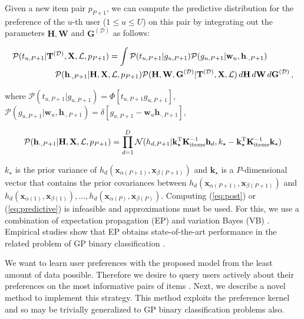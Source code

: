 \vspace{-0.4cm}
\normalsize Given a new item pair $p_{P+1}$, we can compute the predictive distribution for the preference of the $u$-th user ($1 \leq u \leq U$) on this pair by integrating out the parameters $\mathbf{H},\mathbf{W}$ and $\mathbf{G}^{(\mathcal{D})}$ as follows:

\vspace{-0.65cm}
{\small
\begin{align}
\mathcal{P}(t_{u,P+1}|&\mathbf{T}^{(\mathcal{D})},\mathbf{X},\mathcal{L},p_{P+1}) =
\int \mathcal{P}(t_{u,P+1}|g_{u,P+1}) \mathcal{P}(g_{u,P+1}|\mathbf{w}_u,\mathbf{h}_{\cdot,P+1})\notag\\
 & \quad \mathcal{P}(\mathbf{h}_{\cdot,P+1}|\mathbf{H},\mathbf{X},\mathcal{L},p_{P+1})
\mathcal{P}(\mathbf{H},\mathbf{W},\mathbf{G}^{(\mathcal{D})}|\mathbf{T}^{(\mathcal{D})},\mathbf{X},\mathcal{L})
\,d\mathbf{H}\,d\mathbf{W}\,d\mathbf{G}^{(\mathcal{D})}\,,
\label{eq:predictions}
\end{align}
}

\vspace{-0.5cm}
\normalsize where $\mathcal{P}(t_{u,P+1}|g_{u,P+1})=\Phi[t_{u,P+1}g_{u,P+1}]$,
$\mathcal{P}(g_{u,P+1}|\mathbf{w}_u,\mathbf{h}_{\cdot,P+1})=\delta[ g_{u,P+1} - \mathbf{w}_u \mathbf{h}_{\cdot,P+1}]$,

\vspace{-0.45cm}
{\small
\begin{equation}
\mathcal{P}(\mathbf{h}_{\cdot,P+1}|\mathbf{H},\mathbf{X},\mathcal{L},p_{P+1})
=\prod_{d=1}^D \mathcal{N}(h_{d,P+1}|\mathbf{k}_\star^\text{T} \mathbf{K}^{-1}_\text{items} \mathbf{h}_d, k_\star -
\mathbf{k}_\star^\text{T}  \mathbf{K}^{-1}_\text{items} \mathbf{k}_\star)
\label{eq:predictive}
\end{equation}
}

\vspace{-0.5cm}
\normalsize $k_\star$ is the prior variance of $h_d(\mathbf{x}_{\alpha(P+1)}, \mathbf{x}_{\beta(P+1)})$
and $\mathbf{k}_\star$ is a $P$-dimensional vector that contains the prior covariances between $h_d(\mathbf{x}_{\alpha(P+1)}, \mathbf{x}_{\beta(P+1)})$
and $h_d(\mathbf{x}_{\alpha(1)}, \mathbf{x}_{\beta(1)}),\ldots,h_d(\mathbf{x}_{\alpha(P)}, \mathbf{x}_{\beta(P)})$.
Computing (\ref{eq:post}) or (\ref{eq:predictive})
is infeasible and approximations must be used.
For this, we use a combination of expectation propagation (EP) \cite{Minka2001} and variation Bayes (VB) \cite{Ghahramani2001}.
Empirical studies show that EP obtains state-of-the-art performance 
in the related problem of GP binary classification \cite{nickisch2008}.

We want to learn user preferences with the proposed model
from the least amount of data possible. Therefore we desire to query
users actively about their preferences on the most informative pairs of items \cite{brochu2007active}.
Next, we describe a novel method to implement this strategy.
This method exploits the preference kernel and so may
be trivially generalized to GP binary classification problems also.
